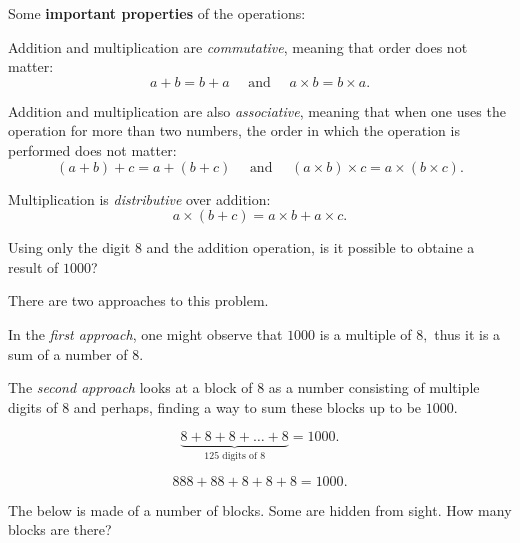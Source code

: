 \documentclass{article}
\begin{document}
\bigbreak

Some \textbf{important properties} of the operations:
\begin{itemize}[topsep=0pt, partopsep=0pt, itemsep=0pt]
    \ii Addition and multiplication are \textit{commutative}, meaning that order does not matter:
    \[
        a + b = b + a \quad \text{\ and\ } \quad a \times b = b \times a.
    \]

    \ii Addition and multiplication are also \textit{associative},
    meaning that when one uses the operation for more than two numbers,
    the order in which the operation is performed does not matter:
    \[
        (a + b) + c = a + (b + c) \quad \text{\ and\ } \quad (a \times b) \times c = a \times (b \times c).
    \]

    \ii Multiplication is \textit{distributive} over addition:
    \[
        a \times (b + c) = a \times b + a \times c.
    \]
\end{itemize}

\newpage

\begin{example*}[Problem 1]
    \label{example:pi-2022-3-p1}
    Using only the digit $8$ and the addition operation,
    is it possible to obtaine a result of $1000$?
\end{example*}

\begin{remark*}
    There are two approaches to this problem.
    
    In the \textit{first approach}, one might observe that $1000$ is a multiple of $8,$
    thus it is a sum of a number of $8$.

    The \textit{second approach} looks at a block of $8$ as a number consisting of multiple digits of $8$
    and perhaps, finding a way to sum these blocks up to be $1000.$
\end{remark*}

\begin{soln}[Solution 1] 
    \[ 
        \underbrace{8+8+8+\ldots+8}_{125 \text{\ digits of\ } 8}=1000.
    \]
\end{soln}

\begin{soln}[Solution 2] 
    \[
        888+88+8+8+8 = 1000.
    \]
\end{soln}

\begin{example*}[Problem 2]
    \label{example:pi-2022-3-p2}
    The  below is made of a number of blocks. Some are hidden from sight.
    How many blocks are there?
\end{example*}
\end{document}
